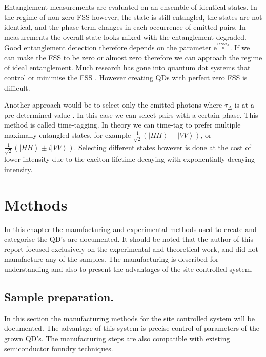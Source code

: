 \documentclass[12pt, twoside]{article}
\numberwithin{equation}{section}
\begin{document}
Entanglement measurements are evaluated on an ensemble of identical
states. In the regime of non-zero FSS however, the state is still
entangled, the states are not identical, and the phase term changes in
each occurrence of emitted pairs. In measurements the overall state
looks mixed with the entanglement degraded. Good entanglement detection
therefore depends on the parameter
$\mathrm e ^{\frac{i FSS \tau_\Delta}{\hbar}}$. If we can make the FSS
to be zero or almost zero therefore we can approach the regime of ideal
entanglement. Much research has gone into quantum dot systems that
control or minimise the FSS \cite{ry1, ry2}. However creating QDs with
perfect zero FSS is difficult.

Another approach would be to select only the emitted photons where
$\tau_\Delta$ is at a pre-determined value \cite{entangletime}. In this
case we can select pairs with a certain phase. This method is called
time-tagging. In theory we can time-tag to prefer multiple maximally
entangled states, for example
$\frac{1}{\sqrt{2}}  \left(\left|H H\right\rangle \pm \left|VV\right\rangle \right)$,
or
$\frac{1}{\sqrt{2}}  \left(\left|H H\right\rangle \pm i\left|VV\right\rangle \right)$.
Selecting different states however is done at the cost of lower
intensity due to the exciton lifetime decaying with exponentially
decaying intensity.

\newpage
\section{Methods}

In this chapter the manufacturing and experimental methods used to
create and categorise the QD's are documented. It should be noted that
the author of this report focused exclusively on the experimental and
theoretical work, and did not manufacture any of the samples. The
manufacturing is described for understanding and also to present the
advantages of the site controlled system.

\subsection{Sample preparation.}\label{sample-preparation.}

In this section the manufacturing methods for the site controlled system
will be documented. The advantage of this system is precise control of
parameters of the grown QD's. The manufacturing steps are also
compatible with existing semiconductor foundry techniques.
\end{document}
